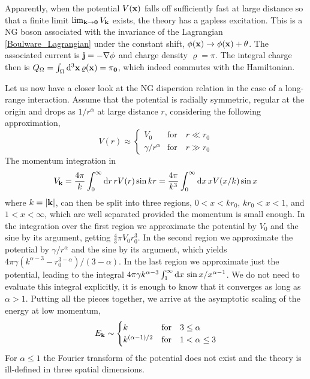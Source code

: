 \documentclass[final,3p,times,12pt,a4paper,sort&compress]{elsarticle}
\newcommand\vek[1]{{\boldsymbol{\bf #1}}}   %
\newcommand\vr{\varrho}
\newcommand\vt{\theta}
\newcommand\abs[1]{\left|#1\right|}         %
\newcommand\dd{\mathop{{\rm d}\!}\nolimits} %
\newcommand\dthree{\mathop{{\rm d}^3\!}\nolimits} %
\begin{document}
Apparently, when the potential $V(\vek x)$ falls off sufficiently fast at large
distance so that a finite limit $\lim_{\vek k\to\vek0}V_{\vek k}$ exists, the
theory has a gapless excitation. This is a NG boson associated with the
invariance of the Lagrangian \eqref{Boulware_Lagrangian} under the constant
shift,
$\phi(\vek x)\to\phi(\vek x)+\vt$. The associated current is $\vek
j=-\nabla\phi$ and charge density $\vr=\pi$. The integral charge then is
$Q_\Omega=\int_\Omega\dthree\vek x\,\vr(\vek x)=\pi_{\vek0}$, which indeed
commutes with the Hamiltonian.

Let us now have a closer look at the NG dispersion relation in the case of a
long-range interaction. Assume that the potential is radially symmetric,
regular at the origin and drops as $1/r^\alpha$ at large distance $r$,
considering the following approximation,
\begin{equation}
V(r)\approx\begin{cases}
V_0 &\text{for}\quad r\ll r_0\\
\gamma/{r^\alpha} &\text{for}\quad r\gg r_0
\end{cases}
\label{longdistpot}
\end{equation}
The momentum integration in
\begin{equation}
V_{\vek k}=\frac{4\pi}k\int_0^\infty\dd r\, rV(r)\sin kr=
\frac{4\pi}{k^3}\int_0^\infty\dd x\,xV(x/k)\sin x
\label{FTpot}
\end{equation}
where $k=\abs{\vek k}$, can then be split into three regions, $0<x<kr_0$,
$kr_0<x<1$, and $1<x<\infty$, which are well separated provided the momentum is
small enough. In the integration over the first region we approximate the
potential by $V_0$ and the sine by its argument, getting $\frac43\pi V_0r_0^3$.
In the second region we approximate the potential by $\gamma/r^\alpha$ and the
sine by its argument, which yields
$4\pi\gamma\left(k^{\alpha-3}-r_0^{3-\alpha}\right)/(3-\alpha)$. In the last
region we approximate just the potential, leading to the integral
$4\pi\gamma k^{\alpha-3}\int_1^\infty\dd x\,\sin x/x^{\alpha-1}$. We do not
need to evaluate this integral explicitly, it is enough to know that it
converges as long as $\alpha>1$. Putting all the pieces together, we arrive at
the asymptotic scaling of the energy at low momentum,
\begin{equation}
E_{\vek k}\sim
\begin{cases}
k & \text{for}\quad3\leq\alpha\\
k^{(\alpha-1)/2} & \text{for}\quad1<\alpha\leq 3
\end{cases}
\end{equation}
For $\alpha\leq1$ the Fourier transform of the potential does not exist and the
theory is ill-defined in three spatial dimensions.
\end{document}
